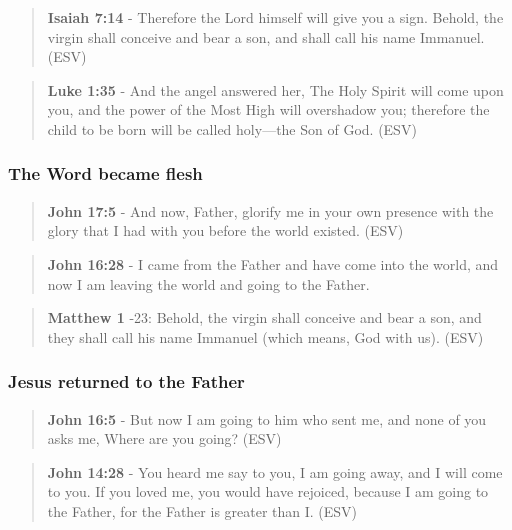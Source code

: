 \documentclass[11pt]{article}
\begin{document}
\begin{quote}
\textbf{Isaiah 7:14} - Therefore the Lord himself will give you a sign. Behold, the virgin shall conceive and bear a son, and shall call his name Immanuel. (ESV)
\end{quote}

\begin{quote}
\textbf{Luke 1:35} - And the angel answered her, The Holy Spirit will come upon you, and the power of the Most High will overshadow you; therefore the child to be born will be called holy—the Son of God. (ESV)
\end{quote}

\subsubsection{The Word became flesh}
\label{sec:orgcb7dcbe}

\begin{quote}
\textbf{John 17:5} - And now, Father, glorify me in your own presence with the glory that I had with you before the world existed. (ESV)
\end{quote}

\begin{quote}
\textbf{John 16:28} - I came from the Father and have come into the world, and now I am leaving the world and going to the Father.
\end{quote}

\begin{quote}
\textbf{Matthew 1} -23: Behold, the virgin shall conceive and bear a son, and they shall call his name Immanuel (which means, God with us). (ESV)
\end{quote}

\subsubsection{Jesus returned to the Father}
\label{sec:orgb28f17e}

\begin{quote}
\textbf{John 16:5} - But now I am going to him who sent me, and none of you asks me, Where are you going? (ESV)
\end{quote}

\begin{quote}
\textbf{John 14:28} - You heard me say to you, I am going away, and I will come to you. If you loved me, you would have rejoiced, because I am going to the Father, for the Father is greater than I. (ESV)
\end{quote}
\end{document}

